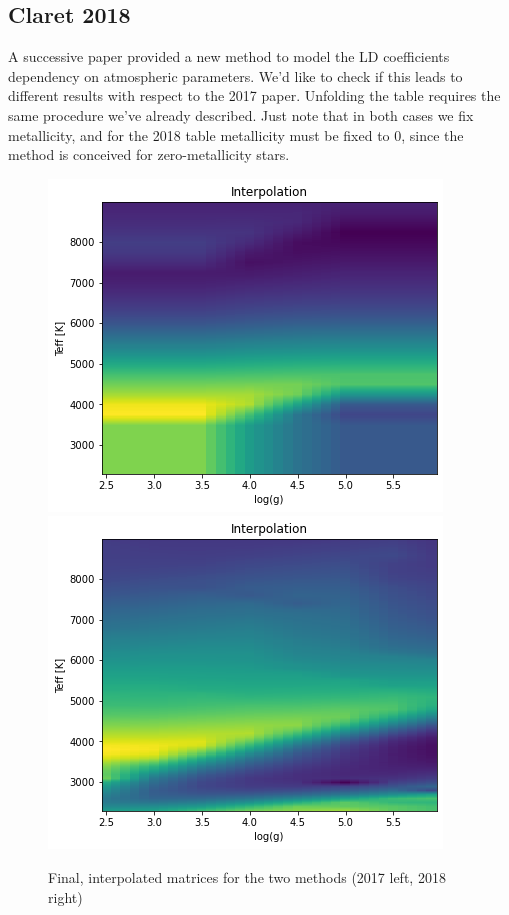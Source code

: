 \documentclass[a4paper,11pt,twocolumn]{article}
\begin{document}
\subsection{Claret 2018}
A successive paper provided a new method to model the LD coefficients dependency 
on atmospheric parameters. We'd like to check if this leads to different results 
with respect to the 2017 paper. Unfolding the table requires the same procedure 
we've already described. Just note that in both cases we fix metallicity, and for 
the 2018 table metallicity must be fixed to 0, since the method is conceived for
zero-metallicity stars.
\begin{figure}[H]
    \centering  
    \includegraphics[scale=0.35, angle=0]{../pictures/ClaretvClaret/2017.png}
    \includegraphics[scale=0.35, angle=0]{../pictures/ClaretvClaret/2018.png}
    \caption{Final, interpolated matrices for the two methods (2017 left, 2018 right)}
\end{figure}
\end{document}
